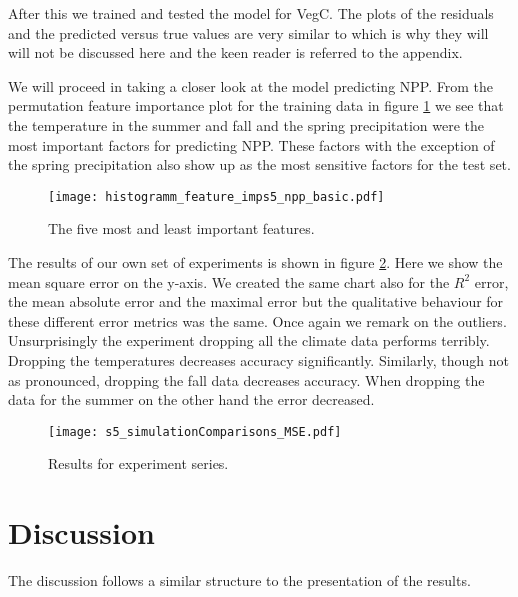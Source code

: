 After this we trained and tested the model for VegC.
The plots of the residuals and the predicted versus true values are very similar to  which is why
they will will not be discussed here and the keen reader is referred to the appendix.

We will proceed in taking a closer look at the model predicting NPP.
From the permutation feature importance plot for the training data in figure \ref{pl:histogramm_feature_imps5_npp_basic}
we see that the temperature in the summer and fall and the spring precipitation were the most important factors for
predicting NPP. These factors with the exception of the spring precipitation also show up as the most sensitive
factors for the test set.
\begin{figure}
  \centering
  \texttt{[image: histogramm\_feature\_imps5\_npp\_basic.pdf]}
  \caption{The five most and least important features.}
  \label{pl:histogramm_feature_imps5_npp_basic}
\end{figure}

The results of our own set of experiments is shown in figure \ref{pl:s5_simulationComparisons_MSE}. Here we show the mean square error
on the y-axis. We created the same chart also for the $R^2$ error, the mean absolute error and the maximal error but the qualitative behaviour
for these different error metrics was the same.
Once again we remark on the outliers.
Unsurprisingly the experiment dropping all the climate data performs terribly.
Dropping the temperatures decreases accuracy significantly. Similarly,
though not as pronounced, dropping the fall data decreases accuracy.
When dropping the data for the summer on the other hand the error decreased. 
\begin{figure}[h]
  \centering
  \begin{minipage}{0.45\textwidth}
    \centering
    \texttt{[image: s5\_simulationComparisons\_MSE.pdf]}
    \caption{Results for experiment series.}
    \label{pl:s5_simulationComparisons_MSE}
  \end{minipage}
\end{figure}

\section{Discussion}

The discussion follows a similar structure to the presentation of the results.

